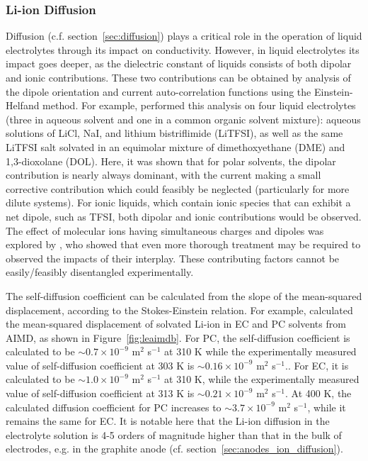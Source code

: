 \documentclass[../main.tex]{subfiles}
\begin{document}
\subsubsection{Li-ion Diffusion}
Diffusion (c.f. section~\ref{sec:diffusion}) plays a critical role in the operation of liquid electrolytes through its impact on conductivity. However, in liquid electrolytes its impact goes deeper, as the dielectric constant of liquids consists of both dipolar and ionic contributions. These two contributions can be obtained by analysis of the dipole orientation and current auto-correlation functions using the Einstein-Helfand method. For example, \citeauthor{coles_correlation_2020} performed this analysis on four liquid electrolytes (three in aqueous solvent and one in a common organic solvent mixture): aqueous solutions of LiCl, NaI, and lithium bistriflimide (LiTFSI), as well as the same LiTFSI salt solvated in an equimolar mixture of dimethoxyethane (DME) and 1,3-dioxolane (DOL).\cite{coles_correlation_2020} Here, it was shown that for polar solvents, the dipolar contribution is nearly always dominant, with the current making a small corrective contribution which could feasibly be neglected (particularly for more dilute systems). For ionic liquids, which contain ionic species that can exhibit a net dipole, such as TFSI, both dipolar and ionic contributions would be observed. The effect of molecular ions having simultaneous charges and dipoles was explored by \citeauthor{schroder_collective_2011}, who showed that even more thorough treatment may be required to observed the impacts of their interplay.\cite{schroder_dielectric_2009} These contributing factors cannot be easily/feasibly disentangled experimentally.

The self-diffusion coefficient can be calculated from the slope of the mean-squared displacement, according to the Stokes-Einstein relation. For example, \citeauthor{Ganesh2011} calculated the mean-squared displacement of solvated Li-ion in EC and PC solvents from AIMD, as shown in Figure~\ref{fig:leaimdb}. For PC, the self-diffusion coefficient is calculated to be $\sim0.7\times10^{-9}$ m$^2$ s$^{-1}$ at 310 K while the experimentally measured value of self-diffusion coefficient at 303 K is $\sim0.16\times10^{-9}$ m$^2$ s$^{-1}$.\cite{Hayamizu1999}. For EC, it is calculated to be $\sim1.0\times10^{-9}$ m$^2$ s$^{-1}$ at 310 K, while the experimentally measured value of self-diffusion coefficient at 313 K is $\sim0.21\times10^{-9}$ m$^2$ s$^{-1}$.\cite{Hayamizu1999} At 400 K, the calculated diffusion coefficient for PC increases to $\sim3.7\times10^{-9}$ m$^2$ s$^{-1}$, while it remains the same for EC. It is notable here that the Li-ion diffusion in the electrolyte solution is 4-5 orders of magnitude higher than that in the bulk of electrodes, e.g. in the graphite anode (cf. section~\ref{sec:anodes_ion_diffusion}).
\end{document}
